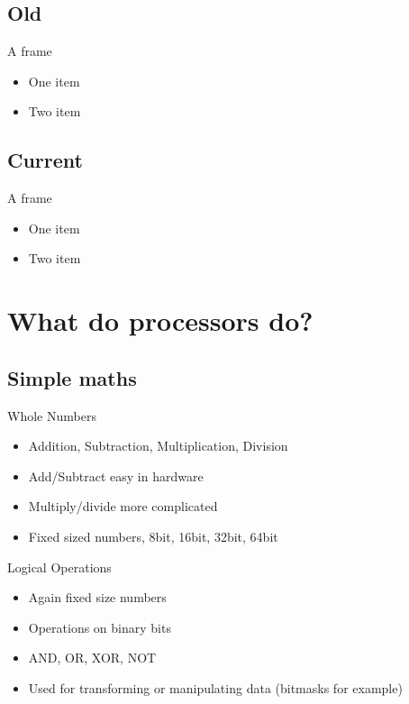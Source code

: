 \documentclass{beamer}
\begin{document}
\subsection[Firsts]{Old}

\begin{frame}{A frame}
  \begin{itemize}
  \item
    One item
  \item
    Two item
  \end{itemize}
\end{frame}

\subsection[Modern]{Current}

\begin{frame}{A frame}
  \begin{itemize}
  \item
    One item
  \item
    Two item
  \end{itemize}
\end{frame}



\section{What do processors do?}

\subsection[Maths]{Simple maths}

\begin{frame}{Whole Numbers}
  \begin{itemize}
  \item
    Addition, Subtraction, Multiplication, Division
  \item
    Add/Subtract easy in hardware
  \item
    Multiply/divide more complicated
  \item
    Fixed sized numbers, 8bit, 16bit, 32bit, 64bit
  \end{itemize}
\end{frame}

\begin{frame}{Logical Operations}
  \begin{itemize}
  \item
    Again fixed size numbers
  \item
    Operations on binary bits
  \item
    AND, OR, XOR, NOT
  \item
    Used for transforming or manipulating data (bitmasks for example)
  \end{itemize}
\end{frame}
\end{document}

